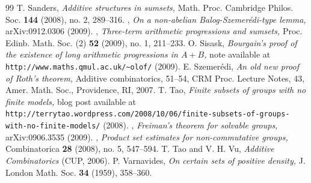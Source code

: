 \documentclass[12pt,a4paper,reqno]{amsart}
\numberwithin{equation}{section}
\theoremstyle{plain}
\theoremstyle{definition}
\begin{document}
\begin{thebibliography}{99}
 T. Sanders, \emph{Additive structures in sumsets,} Math. Proc. Cambridge Philos. Soc. \textbf{144} (2008), no. 2, 289--316.
 \bysame, \emph{On a non-abelian Balog-Szemer\'edi-type lemma,} arXiv:0912.0306 (2009).
 \bysame, \emph{Three-term arithmetic progressions and sumsets,} Proc. Edinb. Math. Soc. (2) \textbf{52} (2009), no. 1, 211--233.
 O. Sisask, \emph{Bourgain's proof of the existence of long arithmetic progressions in $A+B$,} note available at \verb+http://www.maths.qmul.ac.uk/~olof/+ (2009).
 E. Szemer\'edi, \emph{An old new proof of Roth's theorem,} Additive combinatorics, 51--54, CRM Proc. Lecture Notes, 43, Amer. Math. Soc., Providence, RI, 2007.
 T. Tao, \emph{Finite subsets of groups with no finite models,} blog post available at \verb+http://terrytao.wordpress.com/2008/10/06/finite-subsets-of-groups-with-no-finite-models/+ (2008).
 \bysame, \emph{Freiman's theorem for solvable groups,} arXiv:0906.3535 (2009).
 \bysame, \emph{Product set estimates for non-commutative groups,} Combinatorica \textbf{28} (2008), no. 5, 547--594.
 T. Tao and V. H. Vu, \emph{Additive Combinatorics} (CUP, 2006).
 P. Varnavides, \emph{On certain sets of positive density,} J. London Math. Soc. \textbf{34} (1959), 358--360.
\end{thebibliography}
\end{document}
